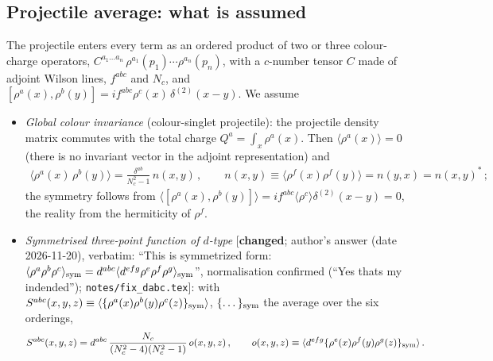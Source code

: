 {\subsection{Projectile average: what is assumed}
\noindent The projectile enters every term as an ordered product of two or three colour-charge operators, $C^{a_{1}\dots a_{n}}\,\rho^{a_{1}}(p_{1})\cdots\rho^{a_{n}}(p_{n})$, with a $c$-number tensor $C$ made of adjoint Wilson lines, $f^{abc}$ and $N_{c}$, and $[\rho^{a}(x),\rho^{b}(y)]=if^{abc}\rho^{c}(x)\,\delta^{(2)}(x-y)$. We assume
\begin{itemize}
\item[(A1)] \emph{Global colour invariance} (colour-singlet projectile): the projectile density matrix commutes with the total charge $Q^{a}=\int_{x}\rho^{a}(x)$. Then $\langle\rho^{a}(x)\rangle=0$ (there is no invariant vector in the adjoint representation) and
\begin{align}
\langle\rho^{a}(x)\,\rho^{b}(y)\rangle=\frac{\delta^{ab}}{N_{c}^{2}-1}\,n(x,y)\,,\qquad n(x,y)\equiv\langle\rho^{f}(x)\rho^{f}(y)\rangle=n(y,x)=n(x,y)^{*}\,;\label{eq:s-A1}
\end{align}
the symmetry follows from $\langle[\rho^{a}(x),\rho^{b}(y)]\rangle=if^{abc}\langle\rho^{c}\rangle\delta^{(2)}(x-y)=0$, the reality from the hermiticity of $\rho^{f}$.
\item[(A2)] \emph{Symmetrised three-point function of $d$-type} [\textbf{changed}; author's answer (date 2026-11-20), verbatim: ``This is symmetrized form: $\langle\rho^{a}\rho^{b}\rho^{c}\rangle_{\rm sym}=d^{abc}\langle d^{efg}\rho^{e}\rho^{f}\rho^{g}\rangle_{\rm sym}$'', normalisation confirmed (``Yes thats my indended''); \texttt{notes/fix\_dabc.tex}]: with $S^{abc}(x,y,z)\equiv\langle\{\rho^{a}(x)\rho^{b}(y)\rho^{c}(z)\}_{\rm sym}\rangle$, $\{\dots\}_{\rm sym}$ the average over the six orderings,
\begin{align}
S^{abc}(x,y,z)=d^{abc}\,\frac{N_{c}}{(N_{c}^{2}-4)(N_{c}^{2}-1)}\,o(x,y,z)\,,\qquad o(x,y,z)\equiv\langle d^{efg}\{\rho^{e}(x)\rho^{f}(y)\rho^{g}(z)\}_{\rm sym}\rangle\,.\label{eq:s-A2d}
\end{align}
\end{itemize}
}
